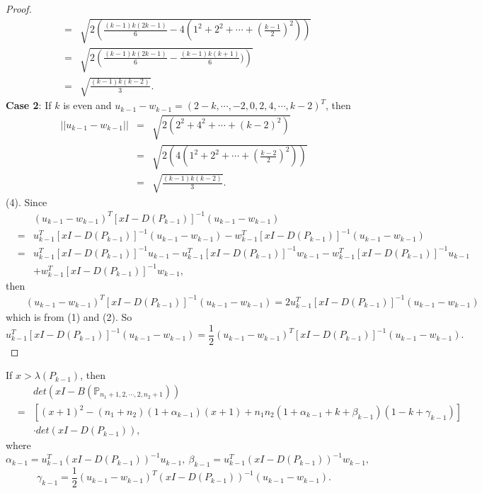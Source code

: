 \documentclass[10pt]{article}
\begin{document}
\begin{proof}
\begin{eqnarray*}
&=&\sqrt{2\left(\frac{(k-1)k(2k-1)}{6}-4(1^2+2^2+\cdots+(\frac{k-1}{2})^2)\right)}\\
&=&\sqrt{2\left(\frac{(k-1)k(2k-1)}{6}-\frac{(k-1)k(k+1)}{6})\right)}\\
&=&\sqrt{\frac{(k-1)k(k-2)}{3}}.
\end{eqnarray*}
{\bf Case 2}: If $k$ is even and $u_{k-1}-w_{k-1}=(2-k,\cdots,-2,0,2,4,\cdots,k-2)^T$, then
\begin{eqnarray*}
||u_{k-1}-w_{k-1}||&=&\sqrt{2\left(2^2+4^2+\cdots+(k-2)^2\right)}\\
&=&\sqrt{2\left(4(1^2+2^2+\cdots+(\frac{k-2}{2})^2)\right)}\\
&=&\sqrt{\frac{(k-1)k(k-2)}{3}}.
\end{eqnarray*}
(4). Since
\begin{eqnarray*}
&&(u_{k-1}-w_{k-1})^T[x I-D(P_{k-1})]^{-1}(u_{k-1}-w_{k-1})\\
&=&u_{k-1}^T[x I-D(P_{k-1})]^{-1}(u_{k-1}-w_{k-1})-w_{k-1}^T[x I-D(P_{k-1})]^{-1}(u_{k-1}-w_{k-1})\\
&=&u_{k-1}^T[x I-D(P_{k-1})]^{-1}u_{k-1}-u_{k-1}^T[x I-D(P_{k-1})]^{-1}w_{k-1}-w_{k-1}^T[x I-D(P_{k-1})]^{-1}u_{k-1}\\
&&+w_{k-1}^T[x I-D(P_{k-1})]^{-1}w_{k-1},
\end{eqnarray*}
then
\begin{eqnarray*}
&&(u_{k-1}-w_{k-1})^T[x I-D(P_{k-1})]^{-1}(u_{k-1}-w_{k-1})=2u_{k-1}^T[x I-D(P_{k-1})]^{-1}(u_{k-1}-w_{k-1})
\end{eqnarray*}
which is from (1) and (2). So
$$u_{k-1}^T[x I-D(P_{k-1})]^{-1}(u_{k-1}-w_{k-1})=\frac{1}{2}(u_{k-1}-w_{k-1})^T[x I-D(P_{k-1})]^{-1}(u_{k-1}-w_{k-1}).$$
\end{proof}
\begin{lemma}\label{Lem2}
If $x>\lambda({P_{k-1}})$, then
\begin{eqnarray*}
&&det (x I -B(\mathbb{P}_{n_1+1,2,\cdots,2,n_2+1}))\\
&=&[ (x+1)^2-(n_1+n_2)(1+\alpha_{k-1} )(x+1)+n_1n_2 (1+\alpha_{k-1}+k+\beta_{k-1} )(1-k+\gamma_{k-1})]\\
&&\cdot det(x I-D(P_{k-1})),
\end{eqnarray*}
where $$\alpha_{k-1}=u_{k-1}^T(x I-D(P_{k-1}))^{-1}u_{k-1},~\beta_{k-1}=u_{k-1}^T(x I-D(P_{k-1}))^{-1}w_{k-1},$$
$$\gamma_{k-1}=\frac{1}{2}(u_{k-1}-w_{k-1})^T(x I-D(P_{k-1}))^{-1}(u_{k-1}-w_{k-1}).$$
\end{lemma}
\end{document}
